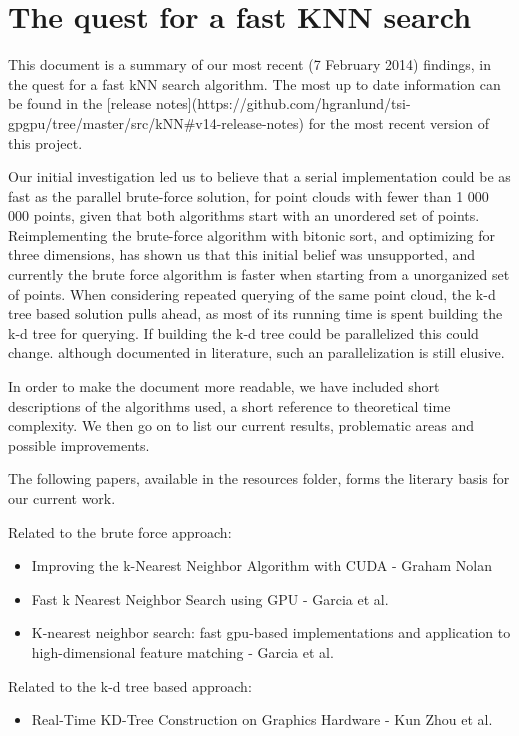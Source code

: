 
\section{The quest for a fast KNN search} %
\label{sec:the_quest_for_a_fast_KNN_search}

This document is a summary of our most recent (7 February 2014) findings, in the quest for a fast kNN search algorithm. The most up to date information can be found in the [release notes](https://github.com/hgranlund/tsi-gpgpu/tree/master/src/kNN#v14-release-notes) for the most recent version of this project.

Our initial investigation led us to believe that a serial implementation could be as fast as the parallel brute-force solution, for point clouds with fewer than 1 000 000 points, given that both algorithms start with an unordered set of points. Reimplementing the brute-force algorithm with bitonic sort, and optimizing for three dimensions, has shown us that this initial belief was unsupported, and currently the brute force algorithm is faster when starting from a unorganized set of points. When considering repeated querying of the same point cloud, the k-d tree based solution pulls ahead, as most of its running time is spent building the k-d tree for querying. If building the k-d tree could be parallelized this could change. although documented in literature, such an parallelization is still elusive.

In order to make the document more readable, we have included short descriptions of the algorithms used, a short reference to theoretical time complexity. We then go on to list our current results, problematic areas and possible improvements.

The following papers, available in the resources folder, forms the literary basis for our current work.

Related to the brute force approach:
\begin{itemize}
    \item Improving the k-Nearest Neighbor Algorithm with CUDA - Graham Nolan
    \item Fast k Nearest Neighbor Search using GPU - Garcia et al.
    \item K-nearest neighbor search: fast gpu-based implementations and application to high-dimensional feature matching - Garcia et al.
\end{itemize}

Related to the k-d tree based approach:
\begin{itemize}
    \item Real-Time KD-Tree Construction on Graphics Hardware - Kun Zhou et al.
\end{itemize}


